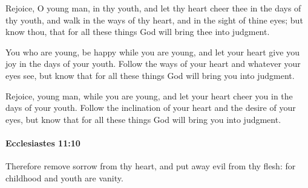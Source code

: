 			\begin{versebox}
					\item[BHS] 
					\item[LXX] 
					\item[ASV] Rejoice, O young man, in thy youth, and let thy heart cheer thee in the days of thy youth, and walk in the ways of thy heart, and in the sight of thine eyes; but know thou, that for all these things God will bring thee into judgment.
					\item[NIV] You who are young, be happy while you are young, and let your heart give you joy in the days of your youth. Follow the ways of your heart and whatever your eyes see, but know that for all these things God will bring you into judgment.
					\item[NRSV] Rejoice, young man, while you are young, and let your heart cheer you in the days of your youth. Follow the inclination of your heart and the desire of your eyes, but know that for all these things God will bring you into judgment.
			\end{versebox}

		\paragraph{Ecclesiastes 11:10} %
			\label{ECCLESIASTES-11-10}

			Therefore remove sorrow from thy heart, and put away evil from thy flesh: for childhood and youth are vanity.

